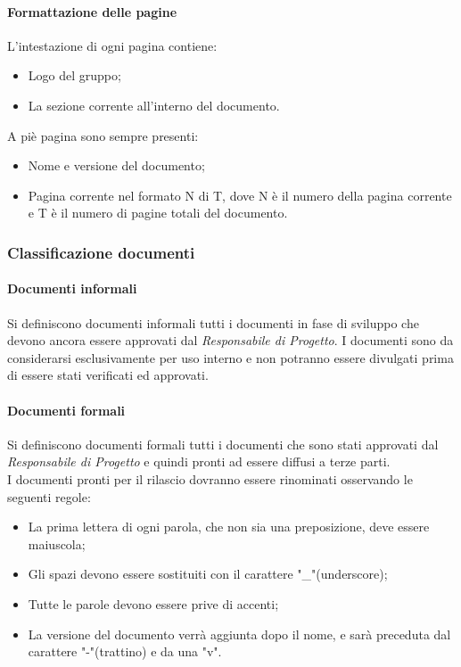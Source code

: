 \paragraph{Formattazione delle pagine}
L'intestazione di ogni pagina contiene:
\begin{itemize}
	\item Logo del gruppo;
	\item La sezione corrente all'interno del documento.
\end{itemize}
A piè pagina sono sempre presenti:
\begin{itemize}
	\item Nome e versione del documento;
	\item Pagina corrente nel formato N di T, dove N è il numero della pagina corrente e T è il numero di pagine totali del documento.
\end{itemize}

\subsubsection{Classificazione documenti}
\paragraph{Documenti informali}
Si definiscono documenti informali tutti i documenti in fase di sviluppo che devono ancora essere approvati dal \textit{Responsabile di Progetto}. I documenti sono da considerarsi esclusivamente per uso interno e non potranno essere divulgati prima di essere stati verificati ed approvati. 
\paragraph{Documenti formali}
Si definiscono documenti formali tutti i documenti che sono stati approvati dal \textit{Responsabile di Progetto} e quindi pronti ad essere diffusi a terze parti.\\
I documenti pronti per il rilascio dovranno essere rinominati osservando le seguenti regole:
\begin{itemize}
	\item La prima lettera di ogni parola, che non sia una preposizione, deve essere maiuscola;
	\item Gli spazi devono essere sostituiti con il carattere "\_"(underscore);
	\item Tutte le parole devono essere prive di accenti;
	\item La versione del documento verrà aggiunta dopo il nome, e sarà preceduta dal carattere "-"(trattino) e da una "v".
\end{itemize}

